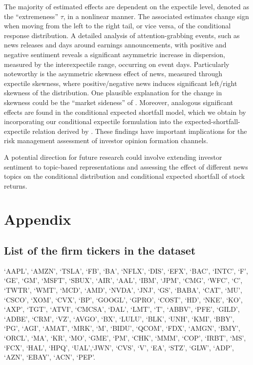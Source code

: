 \documentclass[11pt]{article}
\begin{document}
The majority of estimated effects are dependent on the expectile level, denoted as the ``extremeness'' \(\tau\), in a nonlinear manner. The associated estimates change sign when moving from the left to the right tail, or vice versa, of the conditional response distribution. A detailed analysis of attention-grabbing events, such as news releases and days around earnings announcements, with positive and negative sentiment reveals a significant asymmetric increase in dispersion, measured by the interexpectile range, occurring on event days. Particularly noteworthy is the asymmetric skewness effect of news, measured through expectile skewness, where positive/negative news induces significant left/right skewness of the distribution. One plausible explanation for the change in skewness could be the ``market sideness'' of \cite{SARKAR2009}. Moreover, analogous significant effects are found in the conditional expected shortfall model, which we obtain by incorporating our conditional expectile formulation into the expected-shortfall-expectile relation derived by \cite{Taylor2008}. These findings have important implications for the risk management assessment of investor opinion formation channels.

A potential direction for future research could involve extending investor sentiment to topic-based representations and assessing the effect of different news topics on the conditional distribution and conditional expected shortfall of stock returns.







\newpage
\hypertarget{appendix}{
\section*{Appendix}\label{appendix}}

\hypertarget{list-of-the-firm-tickers-in-the-dataset}{%
\subsection*{List of the firm tickers in the dataset}\label{list-of-the-firm-tickers-in-the-dataset}}

`AAPL', `AMZN', `TSLA', `FB', `BA', `NFLX', `DIS', `EFX', `BAC', `INTC', `F', `GE', `GM',
`MSFT', `SBUX', `AIR', `AAL', `IBM', `JPM', `CMG', `WFC', `C', 
`TWTR', 
`WMT', `MCD', `AMD', `NVDA', `JNJ', `GS',
`BABA', `CAT', `MU', `CSCO', `XOM', `CVX', `BP', `GOOGL', `GPRO', `COST', `HD', `NKE', `KO',
`AXP', `TGT', 
`ATVI', 
`CMCSA', `DAL', `LMT', `T', `ABBV', `PFE', `GILD', `ADBE', `CRM', `VZ', `AVGO', `BX',
`LULU', `BLK', `UNH', `KMI', `BBY', `PG', `AGI', `AMAT', `MRK', `M', `BIDU', `QCOM', `FDX', `AMGN',
`BMY', `ORCL', 
 `MA', `KR', `MO', `GME', `PM', `CHK', `MMM', 
`COP', `IRBT', `MS',
`FCX', `HAL', `HPQ', `UAL',`JWN', `CVS', `V', `EA', `STZ', `GLW', `ADP', `AZN', `EBAY', `ACN', `PEP'.
\end{document}
